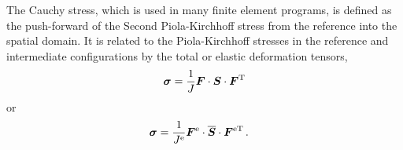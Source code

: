 \documentclass[10pt,letterpaper,oneside]{report}
\newcommand{\ten}[1]{\mbox{\boldmath $#1$}{}}
\newcommand{\scas}[1]{\mbox{{\scriptsize{${\rm{#1}}$}}}{}}
\newcommand{\tens}[1]{\mbox{\boldmath{\scriptsize{$#1$}}}{}}
\begin{document}
The Cauchy stress, which is used in many finite element programs, is defined as the push-forward of the Second Piola-Kirchhoff stress from the reference into the spatial domain.  It is related to the Piola-Kirchhoff stresses in the reference and intermediate configurations by the total or elastic deformation tensors, 
\begin{equation}
\ten{\sigma} = \frac{1}{J} \ten{F} \cdot \ten{S} \cdot \ten{F}^{\scas{T}}  
\end{equation}
or 
\begin{align}
\ten{\sigma} ={}& \frac{1}{J^{\scas{e}}} \ten{F}^{\scas{e}} \cdot \overline{\ten{S}} \cdot \ten{F}^{\scas{eT}} \, .
\end{align}
\end{document}
